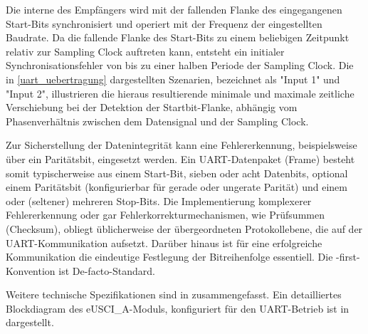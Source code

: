 Die interne  des Empf\"angers wird mit der fallenden Flanke des eingegangenen Start-Bits synchronisiert und operiert mit der Frequenz der eingestellten Baudrate. Da die fallende Flanke des Start-Bits zu einem beliebigen Zeitpunkt relativ zur Sampling Clock auftreten kann, entsteht ein initialer Synchronisationsfehler von bis zu einer halben Periode der Sampling Clock. Die in \ref{uart_uebertragung} dargestellten Szenarien, bezeichnet als "Input 1" und "Input 2", illustrieren die hieraus resultierende minimale und maximale zeitliche Verschiebung bei der Detektion der Startbit-Flanke, abh\"angig vom Phasenverh\"altnis zwischen dem Datensignal und der Sampling Clock.

Zur Sicherstellung der Datenintegrit\"at kann eine Fehlererkennung, beispielsweise \"uber ein Parit\"atsbit, eingesetzt werden. Ein UART-Datenpaket (Frame) besteht somit typischerweise aus einem Start-Bit, sieben oder acht Datenbits, optional einem Parit\"atsbit (konfigurierbar f\"ur gerade oder ungerate Parit\"at) und einem oder (seltener) mehreren Stop-Bits. Die Implementierung komplexerer Fehlererkennung oder gar Fehlerkorrekturmechanismen, wie \zB Prüfsummen (Checksum), obliegt \"ublicherweise der \"ubergeordneten Protokollebene, die auf der UART-Kommunikation aufsetzt. Dar\"uber hinaus ist f\"ur eine erfolgreiche Kommunikation die eindeutige Festlegung der Bitreihenfolge essentiell. Die -first-Konvention ist De-facto-Standard.

Weitere technische Spezifikationen sind in  zusammengefasst. Ein detailliertes Blockdiagram des eUSCI\_A-Moduls, konfiguriert f\"ur den UART-Betrieb ist in  dargestellt.

